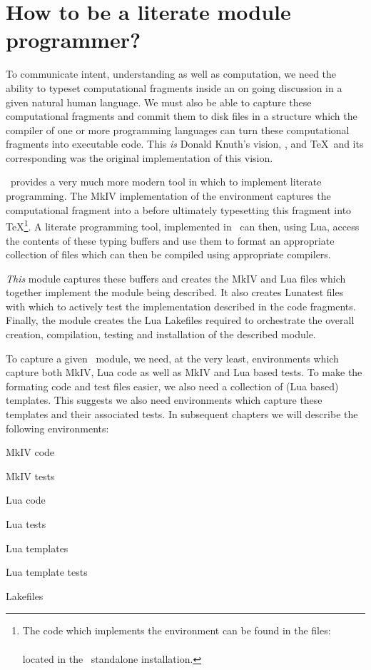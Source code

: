\section{How to be a literate module programmer?} 

To communicate intent, understanding as well as computation, we need the 
ability to typeset computational fragments inside an on going discussion 
in a given natural human language. We must also be able to capture these 
computational fragments and commit them to disk files in a structure which 
the compiler of one or more programming languages can turn these 
computational fragments into executable code. This \emph{is} Donald 
Knuth's vision, \cite{knuth1984literateProgramming}, and \TeX\ and its 
corresponding  was the original implementation of this vision. 

\ConTeXt\ provides a very much more modern tool in which to implement 
literate programming. The MkIV implementation of the  
environment captures the computational fragment into a  
before ultimately typesetting this fragment into \TeX\footnote{The code 
which implements the  environment can be found in the 
files:\\ 
\\ 
located in the \ConTeXt\ standalone installation.}. A literate programming 
tool, implemented in \ConTeXt\, can then, using Lua, access the contents 
of these typing buffers and use them to format an appropriate collection 
of files which can then be compiled using appropriate compilers. 

\emph{This}  module captures these buffers and 
creates the MkIV and Lua files which together implement the module being 
described. It also creates Lunatest files with which to actively test the 
implementation described in the code fragments. Finally, the 
 module creates the Lua Lakefiles required to 
orchestrate the overall creation, compilation, testing and installation 
of the described module. 

To capture a given \ConTeXt\ module, we need, at the very least, 
 environments which capture both MkIV, Lua code as well as 
MkIV and Lua based tests. To make the formating code and test files 
easier, we also need a collection of (Lua based) templates. This suggests 
we also need  environments which capture these templates and 
their associated tests. In subsequent chapters we will describe the 
following environments: 
%
\startitemize
\item MkIV code
\item MkIV tests
\item Lua code
\item Lua tests
\item Lua templates
\item Lua template tests
\item Lakefiles
\stopitemize

\stopchapter 

